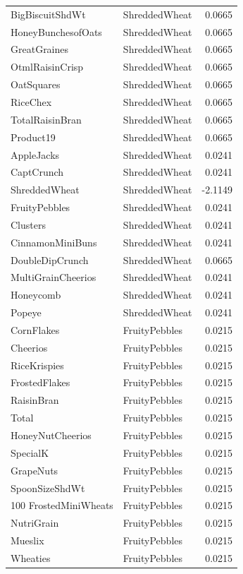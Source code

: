 \begin{longtable}{llr}
BigBiscuitShdWt & ShreddedWheat & 0.0665 \\
HoneyBunchesofOats & ShreddedWheat & 0.0665 \\
GreatGraines & ShreddedWheat & 0.0665 \\
OtmlRaisinCrisp & ShreddedWheat & 0.0665 \\
OatSquares & ShreddedWheat & 0.0665 \\
RiceChex & ShreddedWheat & 0.0665 \\
TotalRaisinBran & ShreddedWheat & 0.0665 \\
Product19 & ShreddedWheat & 0.0665 \\
AppleJacks & ShreddedWheat & 0.0241 \\
CaptCrunch & ShreddedWheat & 0.0241 \\
ShreddedWheat & ShreddedWheat & -2.1149 \\
FruityPebbles & ShreddedWheat & 0.0241 \\
Clusters & ShreddedWheat & 0.0241 \\
CinnamonMiniBuns & ShreddedWheat & 0.0241 \\
DoubleDipCrunch & ShreddedWheat & 0.0665 \\
MultiGrainCheerios & ShreddedWheat & 0.0241 \\
Honeycomb & ShreddedWheat & 0.0241 \\
Popeye & ShreddedWheat & 0.0241 \\
CornFlakes & FruityPebbles & 0.0215 \\
Cheerios & FruityPebbles & 0.0215 \\
RiceKrispies & FruityPebbles & 0.0215 \\
FrostedFlakes & FruityPebbles & 0.0215 \\
RaisinBran & FruityPebbles & 0.0215 \\
Total & FruityPebbles & 0.0215 \\
HoneyNutCheerios & FruityPebbles & 0.0215 \\
SpecialK & FruityPebbles & 0.0215 \\
GrapeNuts & FruityPebbles & 0.0215 \\
SpoonSizeShdWt & FruityPebbles & 0.0215 \\
100%
FrostedMiniWheats & FruityPebbles & 0.0215 \\
NutriGrain & FruityPebbles & 0.0215 \\
Mueslix & FruityPebbles & 0.0215 \\
Wheaties & FruityPebbles & 0.0215 \\

\end{longtable}
